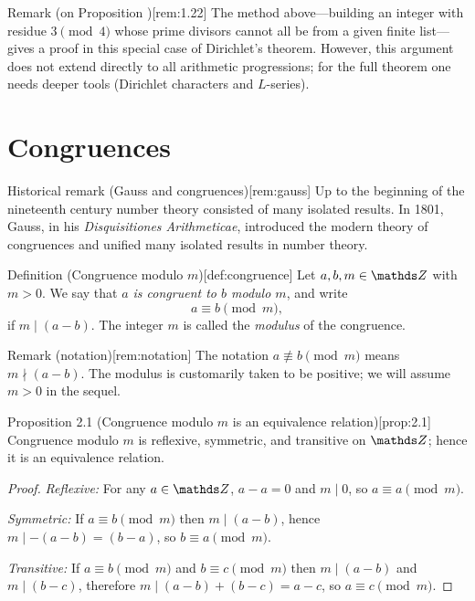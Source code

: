 \documentclass[10pt]{article}
\theoremstyle{definition}
\theoremstyle{plain}
\numberwithin{equation}{section}
\begin{document}
\begin{define}{Remark (on Proposition )}[rem:1.22]
The method above—building an integer with residue $3\pmod{4}$ whose prime divisors cannot all
be from a given finite list—gives a proof in this special case of Dirichlet's theorem. However,
this argument does not extend directly to all arithmetic progressions; for the full theorem one
needs deeper tools (Dirichlet characters and $L$-series).
\end{define}

\section*{Congruences}

\begin{define}{Historical remark (Gauss and congruences)}[rem:gauss]
Up to the beginning of the nineteenth century number theory consisted of many isolated
results. In 1801, Gauss, in his \emph{Disquisitiones Arithmeticae}, introduced the modern theory
of congruences and unified many isolated results in number theory.
\end{define}

\begin{define}{Definition (Congruence modulo $m$)}[def:congruence]
Let $a,b,m\in\setZ$ with $m>0$. We say that \emph{$a$ is congruent to $b$ modulo $m$},
and write
\[
a\equiv b\pmod{m},
\]
if $m\mid (a-b)$. The integer $m$ is called the \emph{modulus} of the congruence.
\end{define}

\begin{define}{Remark (notation)}[rem:notation]
The notation $a\not\equiv b\pmod{m}$ means $m\nmid (a-b)$. The modulus is customarily taken
to be positive; we will assume $m>0$ in the sequel.
\end{define}

\begin{define}{Proposition 2.1 (Congruence modulo $m$ is an equivalence relation)}[prop:2.1]
Congruence modulo $m$ is reflexive, symmetric, and transitive on $\setZ$; hence it is
an equivalence relation.
\end{define}

\begin{proof}
\emph{Reflexive:} For any $a\in\setZ$, $a-a=0$ and $m\mid 0$, so $a\equiv a\pmod{m}$.

\emph{Symmetric:} If $a\equiv b\pmod{m}$ then $m\mid (a-b)$, hence $m\mid -(a-b)=(b-a)$, so
$b\equiv a\pmod{m}$.

\emph{Transitive:} If $a\equiv b\pmod{m}$ and $b\equiv c\pmod{m}$ then $m\mid (a-b)$ and
$m\mid (b-c)$, therefore $m\mid (a-b)+(b-c)=a-c$, so $a\equiv c\pmod{m}$.
\end{proof}
\end{document}
